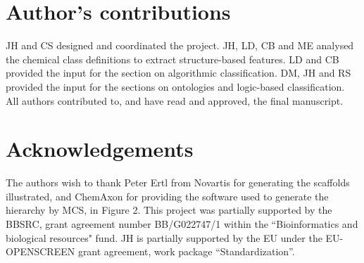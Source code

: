 \documentclass[10pt]{bmc_article}
\newenvironment{bmcformat}{\baselineskip20pt\sloppy\setboolean{publ}{false}}{\baselineskip20pt\sloppy}
\begin{document}
\begin{bmcformat}
\bigskip


\section*{Author's contributions}
    JH and CS designed and coordinated the project. JH, LD, CB and ME analysed the chemical class definitions to extract structure-based features. LD and CB provided the input for the section on algorithmic classification. DM, JH and RS provided the input for the sections on ontologies and logic-based classification. All authors contributed to, and have read and approved, the final manuscript. 

    

\section*{Acknowledgements}
The authors wish to thank Peter Ertl from Novartis for generating the scaffolds illustrated, and ChemAxon for providing the software used to generate the hierarchy by MCS, in Figure 2. This project was partially supported by the BBSRC, grant agreement number BB/G022747/1 within the ``Bioinformatics and biological resources" fund. JH is partially supported by the EU under the EU-OPENSCREEN grant agreement, work package ``Standardization''. 
 

\newpage
{
   }     %


\end{bmcformat}
\end{document}
